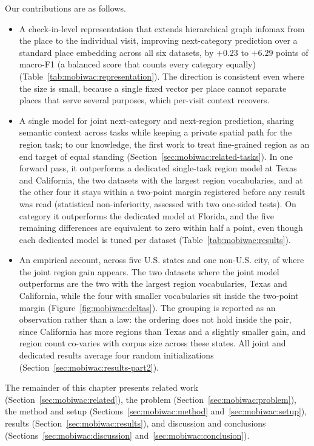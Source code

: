 Our contributions are as follows.
\begin{itemize}
  \item A check-in-level representation that extends hierarchical graph infomax from the place to the individual visit, improving next-category prediction over a standard place embedding across all six datasets, by $+0.23$ to $+6.29$ points of macro-F1 (a balanced score that counts every
    category equally) (Table~\ref{tab:mobiwac:representation}). The direction is
    consistent even where the size is small, because a single fixed vector
    per place cannot separate places that serve several purposes, which
    per-visit context recovers.
  \item A single model for joint next-category and next-region prediction, sharing semantic context across tasks while keeping a private spatial path for the region task; to our knowledge, the first work to treat fine-grained region as an end target of equal standing (Section~\ref{sec:mobiwac:related-tasks}). In one forward pass, it outperforms a dedicated
    single-task region model at Texas and California, the two datasets with the
    largest region vocabularies, and at the other four it stays within a
    two-point margin registered before any result was read (statistical
    non-inferiority, assessed with two one-sided tests). On category it
    outperforms the dedicated model at Florida, and the five remaining
    differences are equivalent to zero within half a point, even though each
    dedicated model is tuned per dataset (Table~\ref{tab:mobiwac:results}).
  \item An empirical account, across five U.S. states and one non-U.S. city, of where the joint
    region gain appears. The two datasets where the joint model outperforms are the two with the
    largest region vocabularies, Texas and California, while the four with smaller vocabularies sit
    inside the two-point margin (Figure~\ref{fig:mobiwac:deltas}). The grouping is reported as an
    observation rather than a law: the ordering does not hold inside the pair, since California has
    more regions than Texas and a slightly smaller gain, and region count co-varies with corpus
    size across these states. All joint and dedicated results average
    four random initializations (Section~\ref{sec:mobiwac:results-part2}).
\end{itemize}

The remainder of this chapter presents related work (Section~\ref{sec:mobiwac:related}), the problem (Section~\ref{sec:mobiwac:problem}), the method and setup (Sections~\ref{sec:mobiwac:method} and~\ref{sec:mobiwac:setup}), results (Section~\ref{sec:mobiwac:results}), and discussion and conclusions (Sections~\ref{sec:mobiwac:discussion} and~\ref{sec:mobiwac:conclusion}).
